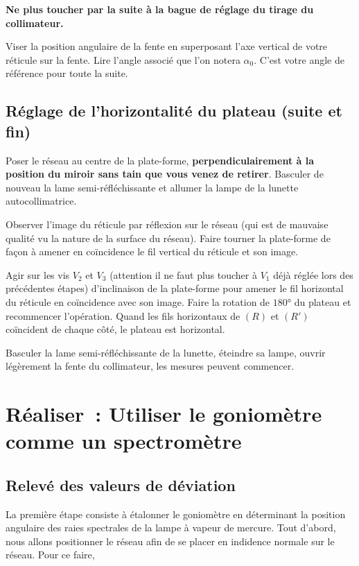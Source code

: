 \documentclass[a4paper, 12pt, final, garamond]{book}
\begin{document}
\medskip

\textbf{Ne plus toucher par la suite à la bague de réglage du tirage du
collimateur.}

\medskip

Viser la position angulaire de la fente en superposant l'axe vertical de votre
réticule sur la fente. Lire l'angle associé que l'on notera $\alpha_0$. C'est
votre angle de référence pour toute la suite. 

\subsection{Réglage de l'horizontalité du plateau (suite et fin)}

Poser le réseau au centre de la plate-forme, \textbf{perpendiculairement à la
position du miroir sans tain que vous venez de retirer}. Basculer de nouveau la
lame semi-réfléchissante et allumer la lampe de la lunette autocollimatrice.

\medskip

Observer l'image du réticule par réflexion sur le réseau (qui est de mauvaise
qualité vu la nature de la surface du réseau). Faire tourner la plate-forme de
façon à amener en coïncidence le fil vertical du réticule et son image. 

\medskip

Agir sur les vis $V_2$ et $V_3$ (attention il ne faut plus toucher à $V_1$ déjà
réglée lors des précédentes étapes) d'inclinaison de la plate-forme pour amener
le fil horizontal du réticule en coïncidence avec son image. Faire la rotation
de $\ang{180;;}$ du plateau et recommencer l'opération. Quand les fils
horizontaux de $(R)$ et $(R')$ coïncident de chaque côté, le plateau est
horizontal.

\medskip

Basculer la lame semi-réfléchissante de la lunette, éteindre sa lampe, ouvrir
légèrement la fente du collimateur, les mesures peuvent commencer.


\section{Réaliser~: Utiliser le goniomètre comme un spectromètre}

\subsection{Relevé des valeurs de déviation}

La première étape consiste à étalonner le goniomètre en déterminant la position
angulaire des raies spectrales de la lampe à vapeur de mercure. Tout d'abord,
nous allons positionner le réseau afin de se placer en indidence normale sur le
réseau. Pour ce faire, 
\end{document}
